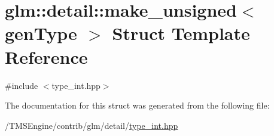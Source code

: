 \hypertarget{structglm_1_1detail_1_1make__unsigned}{}\section{glm\+:\+:detail\+:\+:make\+\_\+unsigned$<$ gen\+Type $>$ Struct Template Reference}
\label{structglm_1_1detail_1_1make__unsigned}


{\ttfamily \#include $<$type\+\_\+int.\+hpp$>$}



The documentation for this struct was generated from the following file\+:\begin{DoxyCompactItemize}
\item 
/\+T\+M\+S\+Engine/contrib/glm/detail/\hyperlink{type__int_8hpp}{type\+\_\+int.\+hpp}\end{DoxyCompactItemize}
